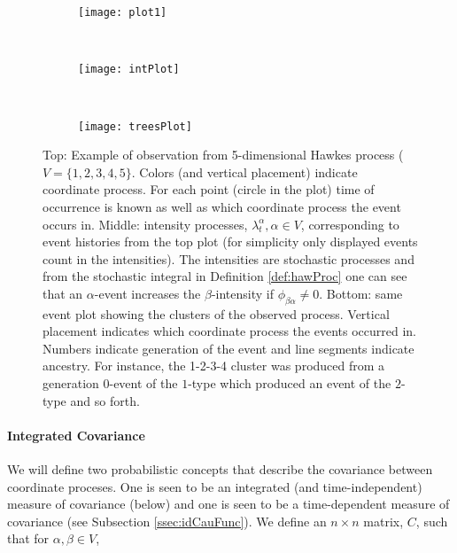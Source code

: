\documentclass[accepted]{uai2021} %
\begin{document}
\begin{figure}
				\begin{subfigure}{0.48\linewidth}
					\centering
					\texttt{[image: plot1]}
				\end{subfigure} \\
				\begin{subfigure}{0.48\linewidth}
					\centering
					\texttt{[image: intPlot]}
				\end{subfigure} \\
				\begin{subfigure}{0.48\linewidth}
					\centering
					\texttt{[image: treesPlot]}
				\end{subfigure}
				\caption{Top: Example of observation from 5-dimensional Hawkes 
				process ($V = \{1,2,3,4,5\}$. Colors (and vertical placement) 
				indicate coordinate 
				process. For each point 
				(circle in the plot) time of occurrence is known as well as 
				which coordinate process the event occurs in. Middle: intensity 
				processes, $\lambda_t^\alpha, \alpha\in V$, corresponding to 
				event 
				histories from the top plot (for simplicity only displayed 
				events 
				count in the intensities). The intensities are stochastic 
				processes and from the stochastic integral in Definition 
				\ref{def:hawProc} one can see that an $\alpha$-event increases 
				the $\beta$-intensity if $\phi_{\beta\alpha} \neq 0$. 
				Bottom: same event plot showing the 
				clusters of the observed process. Vertical placement indicates 
				which coordinate process the events occurred in. Numbers 
				indicate 
				generation 
				of the event and line segments indicate ancestry. For instance, 
				the 1-2-3-4 cluster was produced from a generation 0-event of 
				the 
				$1$-type which produced an event of the $2$-type and so forth.}
			\label{fig:haw}
\end{figure}


\paragraph{Integrated Covariance}

We will define two probabilistic concepts that describe the covariance between 
coordinate proceses. One 
is seen to be an integrated (and time-independent) measure of covariance 
(below) and 
one is seen to be a 
time-dependent measure of covariance (see Subsection \ref{ssec:idCauFunc}). We 
define an $n\times n$ matrix, $C$, such that for $\alpha,\beta\in V$,
\end{document}
